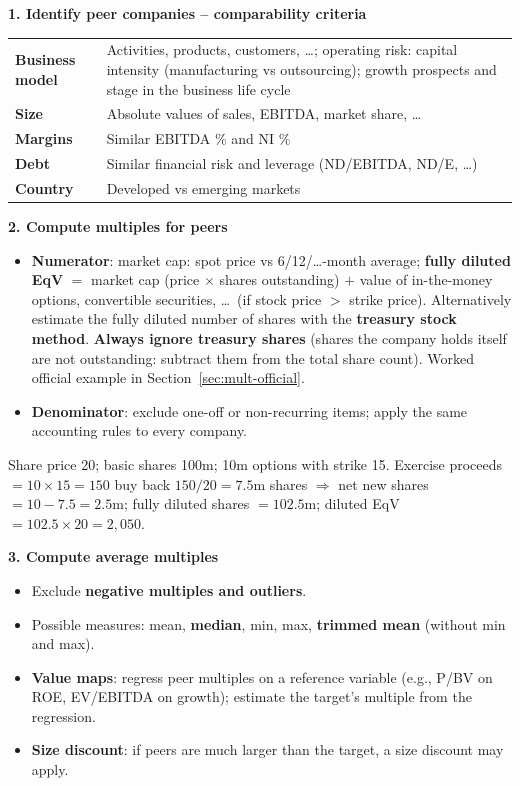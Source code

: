 \textbf{1. Identify peer companies -- comparability criteria}
\begin{center}
\small
\begin{tabular}{@{}>{\bfseries}l p{11cm}@{}}
Business model & Activities, products, customers, \dots; operating risk: capital intensity (manufacturing vs outsourcing); growth prospects and stage in the business life cycle\\
Size & Absolute values of sales, EBITDA, market share, \dots\\
Margins & Similar EBITDA \% and NI \%\\
Debt & Similar financial risk and leverage (ND/EBITDA, ND/E, \dots)\\
Country & Developed vs emerging markets\\
\end{tabular}
\end{center}
\textbf{2. Compute multiples for peers}
\begin{itemize}
  \item \textbf{Numerator}: market cap: spot price vs 6/12/\dots-month average; \textbf{fully diluted EqV} $=$ market cap (price $\times$ shares outstanding) $+$ value of in-the-money options, convertible securities, \dots\ (if stock price $>$ strike price). Alternatively estimate the fully diluted number of shares with the \textbf{treasury stock method}. \textbf{Always ignore treasury shares} (shares the company holds itself are not outstanding: subtract them from the total share count). Worked official example in Section~\ref{sec:mult-official}.
  \item \textbf{Denominator}: exclude one-off or non-recurring items; apply the same accounting rules to every company.
\end{itemize}
\begin{exbox}
Share price 20; basic shares 100m; 10m options with strike 15. Exercise proceeds $=10\times15=150$ buy back $150/20=7.5$m shares $\Rightarrow$ net new shares $=10-7.5=2.5$m; fully diluted shares $=102.5$m; diluted EqV $=102.5\times20=2{,}050$.
\end{exbox}
\textbf{3. Compute average multiples}
\begin{itemize}
  \item Exclude \textbf{negative multiples and outliers}.
  \item Possible measures: mean, \textbf{median}, min, max, \textbf{trimmed mean} (without min and max).
  \item \textbf{Value maps}: regress peer multiples on a reference variable (e.g., P/BV on ROE, EV/EBITDA on growth); estimate the target's multiple from the regression.
  \item \textbf{Size discount}: if peers are much larger than the target, a size discount may apply.
\end{itemize}
